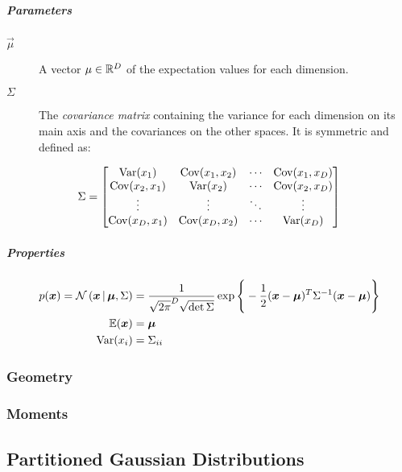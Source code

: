 			\subparagraph{Parameters}
				\begin{description}
					\item[\(\vec{\mu}\)] A vector \( \mu \in \mathbb{R}^D \) of the expectation values for each dimension.
					\item[\(\Sigma\)] The \emph{covariance matrix} containing the variance for each dimension on its main axis and the covariances on the other spaces. It is symmetric and defined as:
				\end{description}
				\begin{equation}
					\Sigma =
					\begin{bmatrix}
						\operatorname{Var}(x_1)      & \operatorname{Cov}(x_1, x_2) & \cdots & \operatorname{Cov}(x_1, x_D) \\
						\operatorname{Cov}(x_2, x_1) & \operatorname{Var}(x_2)      & \cdots & \operatorname{Cov}(x_2, x_D) \\
						\vdots         & \vdots         & \ddots & \vdots         \\
						\operatorname{Cov}(x_D, x_1) & \operatorname{Cov}(x_D, x_2) & \cdots & \operatorname{Var}(x_D)
					\end{bmatrix}
				\end{equation}

			\subparagraph{Properties}
				\begin{align}
					p(\bm{x}) = \mathcal{N}\,(\bm{x} \,\vert\, \bm{\mu}, \Sigma) & = \frac{1}{\sqrt{2\pi}^D \sqrt{\det \Sigma}} \exp\Bigg\{ -\frac{1}{2} (\bm{x} - \bm{\mu})^T \Sigma^{-1} (\bm{x} - \bm{\mu}) \Bigg\} \\
					\mathbb{E}(\bm{x})                                                  & = \bm{\mu}                                                                                                                             \\
					\operatorname{Var}(x_i)                                                    & = \Sigma_{ii}
				\end{align}

			\subsubsection{Geometry} %

			\subsubsection{Moments} %

		\subsection{Partitioned Gaussian Distributions} %

